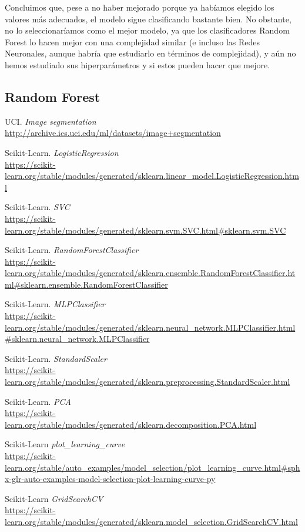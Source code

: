 \documentclass[11pt,a4paper]{article}
\begin{document}
Concluimos que, pese a no haber mejorado porque ya habíamos elegido los valores más adecuados, el modelo sigue clasificando bastante bien. No obstante, no lo seleccionaríamos como el mejor modelo, ya que los clasificadores Random Forest lo hacen mejor con una complejidad similar (e incluso las Redes Neuronales, aunque habría que estudiarlo en términos de complejidad), y aún no hemos estudiado sus hiperparámetros y si estos pueden hacer que mejore.

\subsection{Random Forest}

\newpage

\begin{thebibliography}{20}

UCI. \textit{Image segmentation}
\\\url{http://archive.ics.uci.edu/ml/datasets/image+segmentation}

Scikit-Learn. \textit{LogisticRegression}
\\\url{https://scikit-learn.org/stable/modules/generated/sklearn.linear_model.LogisticRegression.html}

Scikit-Learn. \textit{SVC}
\\\url{https://scikit-learn.org/stable/modules/generated/sklearn.svm.SVC.html#sklearn.svm.SVC}

Scikit-Learn. \textit{RandomForestClassifier}
\\\url{https://scikit-learn.org/stable/modules/generated/sklearn.ensemble.RandomForestClassifier.html#sklearn.ensemble.RandomForestClassifier}

Scikit-Learn. \textit{MLPClassifier}
\\\url{https://scikit-learn.org/stable/modules/generated/sklearn.neural_network.MLPClassifier.html#sklearn.neural_network.MLPClassifier}

Scikit-Learn. \textit{StandardScaler}
\\\url{https://scikit-learn.org/stable/modules/generated/sklearn.preprocessing.StandardScaler.html}

Scikit-Learn. \textit{PCA}
\\\url{https://scikit-learn.org/stable/modules/generated/sklearn.decomposition.PCA.html}

Scikit-Learn \textit{plot\_learning\_curve}
\\\url{https://scikit-learn.org/stable/auto_examples/model_selection/plot_learning_curve.html#sphx-glr-auto-examples-model-selection-plot-learning-curve-py}

Scikit-Learn \textit{GridSearchCV}
\\\url{https://scikit-learn.org/stable/modules/generated/sklearn.model_selection.GridSearchCV.html}

\end{thebibliography}
\end{document}
